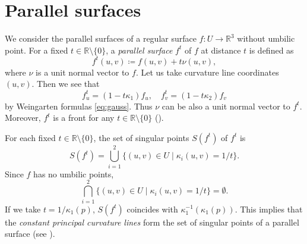 \documentclass[11pt,a4paper,pdflatex,final]{amsart}
\theoremstyle{plain}
\theoremstyle{definition}
\theoremstyle{remark}
\newcommand{\0}{\bm{0}}
\newcommand{\R}{\mathbb{R}}
\newcommand{\first}{\operatorname{I}}
\newcommand{\second}{\operatorname{II}}
\numberwithin{equation}{section}
\begin{document}
\section{Parallel surfaces}\label{sec:parallel}
We consider the parallel surfaces of a regular surface $f\colon U\to\R^3$ 
without umbilic point. 
For a fixed $t\in\R\setminus\{0\}$, 
a \textit{parallel surface} $f^t$ of $f$ at distance $t$ 
is defined as 
\begin{equation}\label{eq:parallel}
f^t(u,v)\coloneqq f(u,v)+t\nu(u,v),
\end{equation}
where $\nu$ is a unit normal vector to $f$. 
Let us take curvature line coordinates $(u,v)$. 
Then we see that 
\begin{equation}\label{eq:d-ft}
f^t_u=(1-t\kappa_1)f_u,\quad 
f^t_v=(1-t\kappa_2)f_v
\end{equation}
by Weingarten formulas {\eqref{eq:gauss}}.  
Thus $\nu$ can be also a unit normal vector to $f^t$. 
Moreover, $f^t$ is a front for any $t\in\R\setminus\{0\}$ (\cite{usy-book}). 
%

For each fixed $t\in\R\setminus\{0\}$, 
the set of singular points $S(f^t)$ of $f^t$ is 
\[
S(f^t)=\bigcup_{i=1}^2\{(u,v)\in U\mid \kappa_i(u,v)=1/t\}.
\]
Since $f$ has no umbilic points, 
\[
\bigcap_{i=1}^2\{(u,v)\in U\mid \kappa_i(u,v)=1/t\}=\emptyset.
\]
If we take $t=1/\kappa_1(p)$, 
$S(f^t)$ coincides with $\kappa_1^{-1}(\kappa_1(p))$. 
This implies that the \textit{constant principal curvature lines} form 
the set of singular points of a parallel surface (see \cite{fh-para}). 
\end{document}
